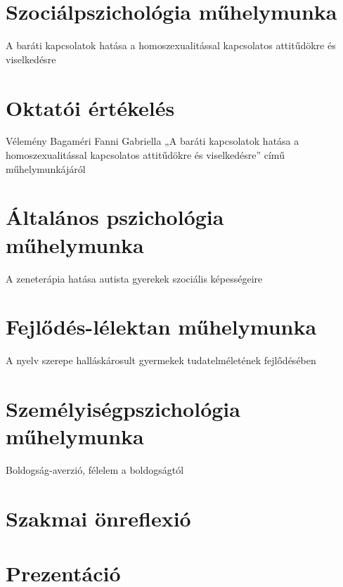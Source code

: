 \documentclass[12pt]{article}
\begin{document}




\pagebreak
\setcounter{tocdepth}{2}
\tableofcontents
\listoftables
\pagebreak
\justify
\newrefsection
\part{Szociálpszichológia műhelymunka}
\begin{large}
	\Large A baráti kapcsolatok hatása a  homoszexualitással kapcsolatos attitűdökre és viselkedésre
\end{large}

\printbibliography[title={Hivatkoz\'asok}]
\pagebreak
\part{Oktatói értékelés}
\begin{large}
	\large Vélemény Bagaméri Fanni Gabriella „A baráti kapcsolatok hatása a homoszexualitással kapcsolatos attitűdökre és viselkedésre” című műhelymunkájáról
\end{large}

\newrefsection
\pagebreak
\part{Általános pszichológia műhelymunka}
\begin{large}
	\Large A zeneterápia hatása autista gyerekek szociális képességeire
\end{large}

\printbibliography[title={Hivatkoz\'asok}]
\newrefsection
\pagebreak
\part{Fejlődés-lélektan műhelymunka}
\begin{large}
	\Large A nyelv szerepe halláskárosult gyermekek tudatelméletének fejlődésében
\end{large}

\printbibliography[title={Hivatkoz\'asok}]
\newrefsection
\pagebreak
\part{Személyiségpszichológia műhelymunka}
\begin{large}
	\Large Boldogság-averzió, félelem a boldogságtól
\end{large}

\printbibliography[title={Hivatkoz\'asok}]
\newrefsection
\pagebreak
\part{Szakmai önreflexió}

\pagebreak
\part{Prezentáció}
\pagebreak
\footnotesize
\end{document}
